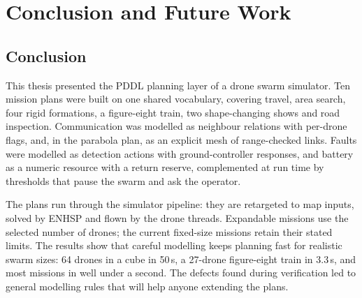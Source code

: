 \documentclass[11pt,a4paper,oneside]{report}
\begin{document}
\chapter{Conclusion and Future Work}\label{ch:conclusion}

\section{Conclusion}
This thesis presented the PDDL planning layer of a drone swarm simulator. Ten mission plans were
built on one shared vocabulary, covering travel, area search, four rigid formations, a
figure-eight train, two shape-changing shows and road inspection. Communication was modelled as
neighbour relations with per-drone flags, and, in the parabola plan, as an explicit mesh of
range-checked links. Faults were modelled as detection actions with ground-controller responses,
and battery as a numeric resource with a return reserve, complemented at run time by thresholds
that pause the swarm and ask the operator.

The plans run through the simulator pipeline: they are retargeted to map inputs,
solved by ENHSP and flown by the drone threads. Expandable missions use the selected
number of drones; the current fixed-size missions retain their stated limits. The results show that
careful modelling keeps planning fast for realistic swarm sizes: 64 drones in a cube in 50\,s,
a 27-drone figure-eight train in 3.3\,s, and most missions in well under a second. The defects
found during verification led to general modelling rules that will help anyone extending the
plans.
\end{document}
